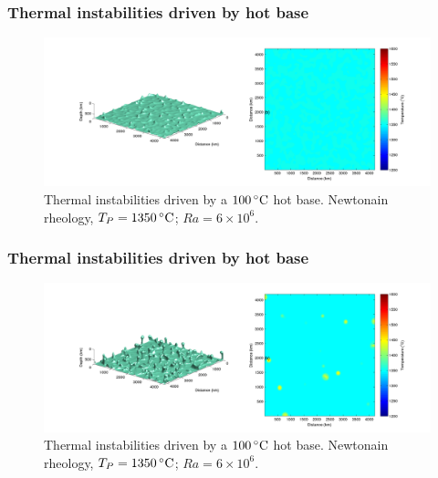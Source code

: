 \documentclass[aspectratio=169]{beamer}
\begin{document}
\begin{frame}
    \frametitle{Thermal instabilities driven by hot base}
    \begin{figure}
        \vspace{-.5cm}
        \includegraphics[width=0.85\paperwidth]{./figures/Newt100/dT1.0741_4x4_Newt_Ra6e6_1.png}
        \caption{Thermal instabilities driven by a $100\rm\,^{\circ}C$ hot base. Newtonain rheology, $T_{P}=1350\rm\,^{\circ}C$; $Ra = 6\times10^{6}$.}
    \end{figure}
\end{frame}

\begin{frame}
    \frametitle{Thermal instabilities driven by hot base}
    \begin{figure}
        \vspace{-.5cm}
        \includegraphics[width=0.85\paperwidth]{./figures/Newt100/dT1.0741_4x4_Newt_Ra6e6_2.png}
        \caption{Thermal instabilities driven by a $100\rm\,^{\circ}C$ hot base. Newtonain rheology, $T_{P}=1350\rm\,^{\circ}C$; $Ra = 6\times10^{6}$.}
    \end{figure}
\end{frame}
\end{document}
